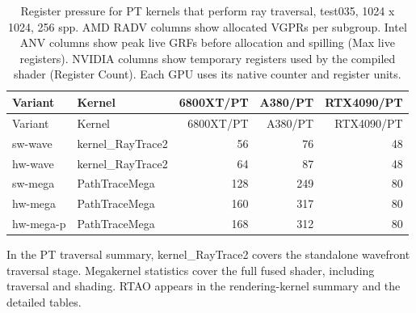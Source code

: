 \begin{longtable}{llrrr}
\caption{Register pressure for PT kernels that perform ray traversal, test035, 1024 x 1024, 256 spp. AMD RADV columns show allocated VGPRs per subgroup. Intel ANV columns show peak live GRFs before allocation and spilling (Max live registers). NVIDIA columns show temporary registers used by the compiled shader (Register Count). Each GPU uses its native counter and register units.}\label{tab:hydra-summary-0-path-traversal}\\
\hline Variant & Kernel & 6800XT/PT & A380/PT & RTX4090/PT \\\hline
\endfirsthead
\hline Variant & Kernel & 6800XT/PT & A380/PT & RTX4090/PT \\\hline
\endhead
sw-wave & kernel\_RayTrace2 & 56 & 76 & 48 \\
hw-wave & kernel\_RayTrace2 & 64 & 87 & 48 \\
sw-mega & PathTraceMega & 128 & 249 & 80 \\
hw-mega & PathTraceMega & 160 & 317 & 80 \\
hw-mega-p & PathTraceMega & 168 & 312 & 80 \\
\hline
\end{longtable}
In the PT traversal summary, kernel\_RayTrace2 covers the standalone wavefront traversal stage. Megakernel statistics cover the full fused shader, including traversal and shading. RTAO appears in the rendering-kernel summary and the detailed tables.\par
\ifdefined\HydraRegisterAnalysis\HydraRegisterAnalysis\fi

